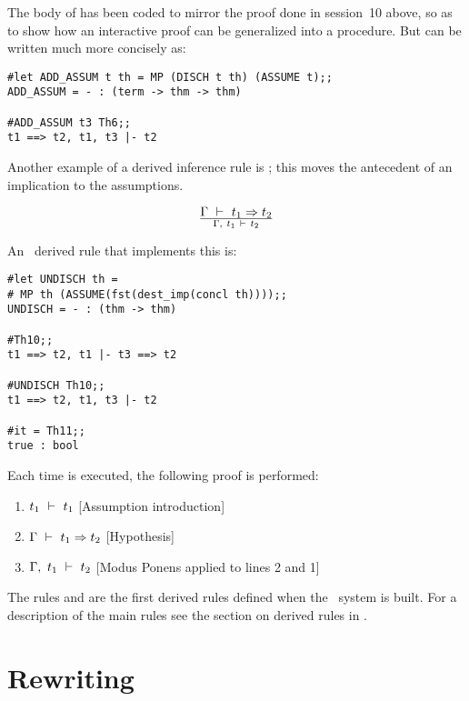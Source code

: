\noindent The body of  has been coded  to mirror  the proof done
in session~10 above, so as to show how an interactive proof  can be generalized
into a  procedure.   But   can be  written much more
concisely as:

\begin{session}\begin{verbatim}
#let ADD_ASSUM t th = MP (DISCH t th) (ASSUME t);;
ADD_ASSUM = - : (term -> thm -> thm)

#ADD_ASSUM t3 Th6;;
t1 ==> t2, t1, t3 |- t2
\end{verbatim}\end{session}


Another example of  a derived  inference rule  is ;  this moves the
antecedent of an implication to the assumptions.

\[ \Gamma\turn t_1\imp t_2 \over\Gamma,\ t_1\turn t_2 \]

\noindent An \ML\ derived rule that implements this is:


\begin{session}\begin{verbatim}
#let UNDISCH th =
# MP th (ASSUME(fst(dest_imp(concl th))));;
UNDISCH = - : (thm -> thm)

#Th10;;
t1 ==> t2, t1 |- t3 ==> t2

#UNDISCH Th10;;
t1 ==> t2, t1, t3 |- t2

#it = Th11;;
true : bool
\end{verbatim}\end{session}

\noindent Each time  is executed,
the following proof is performed:

\begin{enumerate}
\item $t_1\ \vdash\  t_1$ \hfill [Assumption introduction]
\item $\Gamma\ \vdash\  t_1\Rightarrow t_2$ \hfill [Hypothesis]
\item $\Gamma,\ t_1\ \vdash\  t_2$ \hfill [Modus Ponens applied to lines 2 and 1]
\end{enumerate}

The rules  and  are the first derived rules
 defined when the \HOL\ system is built. For a description
of the main rules see the section on derived rules in
\DESCRIPTION.

\section{Rewriting}

